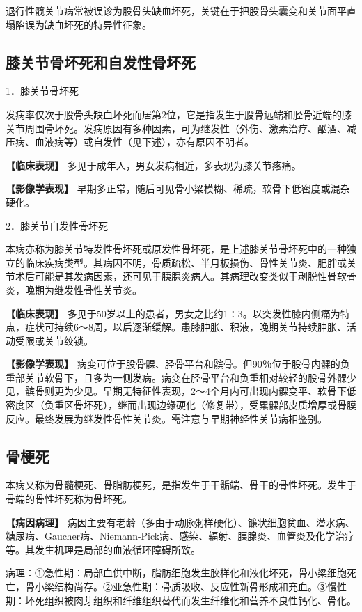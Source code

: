 退行性髋关节病常被误诊为股骨头缺血坏死，关键在于把股骨头囊变和关节面平直塌陷误为缺血坏死的特异性征象。

\subsection{膝关节骨坏死和自发性骨坏死}

1．膝关节骨坏死

发病率仅次于股骨头缺血坏死而居第2位，它是指发生于股骨远端和胫骨近端的膝关节周围骨坏死。发病原因有多种因素，可为继发性（外伤、激素治疗、酗酒、减压病、血液病等）或自发性（见下述），亦有原因不明者。

\textbf{【临床表现】} 多见于成年人，男女发病相近，多表现为膝关节疼痛。

\textbf{【影像学表现】}
早期多正常，随后可见骨小梁模糊、稀疏，软骨下低密度或混杂硬化。

2．膝关节自发性骨坏死

本病亦称为膝关节特发性骨坏死或原发性骨坏死，是上述膝关节骨坏死中的一种独立的临床疾病类型。其病因不明，骨质疏松、半月板损伤、骨性关节炎、肥胖或关节术后可能是其发病因素，还可见于胰腺炎病人。其病理改变类似于剥脱性骨软骨炎，晚期为继发性骨性关节炎。

\textbf{【临床表现】}
多见于50岁以上的患者，男女之比约1∶3。以突发性膝内侧痛为特点，症状可持续6～8周，以后逐渐缓解。患膝肿胀、积液，晚期关节持续肿胀、活动受限或关节绞锁。

\textbf{【影像学表现】}
病变可位于股骨髁、胫骨平台和髌骨。但90％位于股骨内髁的负重部关节软骨下，且多为一侧发病。病变在胫骨平台和负重相对较轻的股骨外髁少见，髌骨则更为少见。早期无特征性表现，2～4个月内可出现内髁变平、软骨下低密度区（负重区骨坏死），继而出现边缘硬化（修复带），受累髁部皮质增厚或骨膜反应。最终发展为继发性骨性关节炎。需注意与早期神经性关节病相鉴别。

\subsection{骨梗死}

本病又称为骨髓梗死、骨脂肪梗死，是指发生于干骺端、骨干的骨性坏死。发生于骨端的骨性坏死称为骨坏死。

\textbf{【病因病理】}
病因主要有老龄（多由于动脉粥样硬化）、镰状细胞贫血、潜水病、糖尿病、Gaucher病、Niemann-Pick病、感染、辐射、胰腺炎、血管炎及化学治疗等。其发生机理是局部的血液循环障碍所致。

病理：①急性期：局部血供中断，脂肪细胞发生胶样化和液化坏死，骨小梁细胞死亡，骨小梁结构尚存。②亚急性期：骨质吸收、反应性新骨形成和充血。③慢性期：坏死组织被肉芽组织和纤维组织替代而发生纤维化和营养不良性钙化、骨化。

